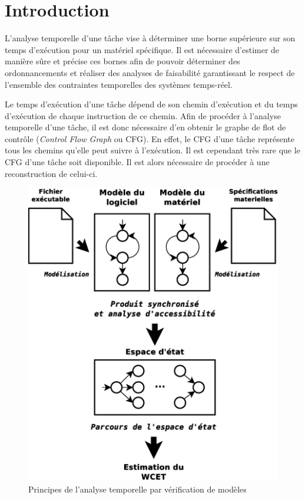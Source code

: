 \section{Introduction}
\label{sec:introduction}


  L'analyse temporelle d'une tâche vise à déterminer une borne supérieure sur
  son temps d'exécution pour un matériel spécifique. Il est nécessaire d'estimer
  de manière sûre et précise ces bornes afin de pouvoir déterminer des
  ordonnancements et réaliser des analyses de faisabilité garantissant le
  respect de l'ensemble des contraintes temporelles des systèmes temps-réel.


  Le temps d'exécution d'une tâche dépend de son chemin d'exécution et du temps
  d'exécution de chaque instruction de ce chemin. Afin de procéder à l'analyse
  temporelle d'une tâche, il est donc nécessaire d'en obtenir le graphe de flot
  de contrôle (\textit{Control Flow Graph} ou CFG). En effet, le CFG d'une tâche
  représente tous les chemins qu'elle peut suivre à l'exécution. Il est
  cependant très rare que le CFG d'une tâche soit disponible. Il est alors
  nécessaire de procéder à une reconstruction de celui-ci.

  \vspace{1em}
  

  \begin{figure}[ht]
    \centering
    \includegraphics[scale=0.3]{img/model-checking.eps}
    \caption{Principes de l'analyse temporelle par vérification de modèles}
    \label{fig:model-checking}
  \end{figure}

